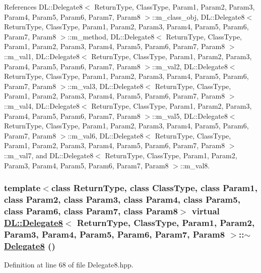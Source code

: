 References DL::Delegate8$<$ Return\-Type, Class\-Type, Param1, Param2, Param3, Param4, Param5, Param6, Param7, Param8 $>$::m\_\-class\_\-obj, DL::Delegate8$<$ Return\-Type, Class\-Type, Param1, Param2, Param3, Param4, Param5, Param6, Param7, Param8 $>$::m\_\-method, DL::Delegate8$<$ Return\-Type, Class\-Type, Param1, Param2, Param3, Param4, Param5, Param6, Param7, Param8 $>$::m\_\-val1, DL::Delegate8$<$ Return\-Type, Class\-Type, Param1, Param2, Param3, Param4, Param5, Param6, Param7, Param8 $>$::m\_\-val2, DL::Delegate8$<$ Return\-Type, Class\-Type, Param1, Param2, Param3, Param4, Param5, Param6, Param7, Param8 $>$::m\_\-val3, DL::Delegate8$<$ Return\-Type, Class\-Type, Param1, Param2, Param3, Param4, Param5, Param6, Param7, Param8 $>$::m\_\-val4, DL::Delegate8$<$ Return\-Type, Class\-Type, Param1, Param2, Param3, Param4, Param5, Param6, Param7, Param8 $>$::m\_\-val5, DL::Delegate8$<$ Return\-Type, Class\-Type, Param1, Param2, Param3, Param4, Param5, Param6, Param7, Param8 $>$::m\_\-val6, DL::Delegate8$<$ Return\-Type, Class\-Type, Param1, Param2, Param3, Param4, Param5, Param6, Param7, Param8 $>$::m\_\-val7, and DL::Delegate8$<$ Return\-Type, Class\-Type, Param1, Param2, Param3, Param4, Param5, Param6, Param7, Param8 $>$::m\_\-val8.\hypertarget{classDL_1_1Delegate8_a1}{
\subsubsection[$\sim$Delegate8]{\setlength{\rightskip}{0pt plus 5cm}template$<$class Return\-Type, class Class\-Type, class Param1, class Param2, class Param3, class Param4, class Param5, class Param6, class Param7, class Param8$>$ virtual \hyperlink{classDL_1_1Delegate8}{DL::Delegate8}$<$ Return\-Type, Class\-Type, Param1, Param2, Param3, Param4, Param5, Param6, Param7, Param8 $>$::$\sim$\hyperlink{classDL_1_1Delegate8}{Delegate8} ()}}
\label{classDL_1_1Delegate8_a1}




Definition at line 68 of file Delegate8.hpp.

